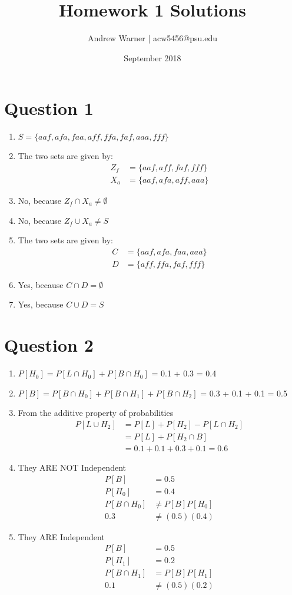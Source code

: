 \documentclass[12pt, letterpaper, fleqn]{article}
\title{Homework 1 Solutions}
\author{Andrew Warner | acw5456@psu.edu}
\date{September 2018}
\begin{document}
\maketitle
\section*{Question 1}
	\begin{enumerate}
		\item $S = \{aaf, afa, faa, aff, ffa, faf, aaa, fff\}$
		\item The two sets are given by:
			\begin{align*}
				Z_{f} &= \{ aaf, aff, faf, fff \} \\
     				X_{a} &= \{ aaf, afa, aff, aaa \}
			\end{align*}
		\item No, because $Z_{f} \cap X_{a} \neq \emptyset$
		\item No, because $Z_{f} \cup X_{a} \neq S$
		\item  The two sets are given by:
			\begin{align*}
				C &= \{aaf, afa, faa, aaa\} \\
				D &= \{aff, ffa, faf, fff\}
			\end{align*}
		 \item Yes, because $C \cap D = \emptyset$
		 \item Yes, because $C \cup D = S$
	\end{enumerate}
\section*{Question 2}
	\begin{enumerate}
		\item $P[H_{0}] = P[L \cap H_0] + P[B \cap H_0]$ = 0.1 + 0.3 = 0.4
		\item $P[B] = P[B \cap H_0] + P[B \cap H_1] + P[B \cap H_2]$ = 0.3 + 0.1 + 0.1 = 0.5
		\item From the additive property of probabilities
			\begin{align*}
				P[L \cup H_2] &= P[L] + P[H_2] - P[L \cap H_2] \\
				& = P[L] + P[H_2 \cap B] \\
				&= 0. 1 + 0.1 + 0.3 + 0.1 = 0.6
			\end{align*}	
		\item They ARE NOT Independent
			\begin{align*}
				P[B] &= 0.5 \\
				P[H_0] &= 0.4 \\
				P[B \cap H_0] &\neq P[B]P[H_0] \\
				0.3 &\neq (0.5)(0.4)
			\end{align*}
		\item They ARE Independent
			\begin {align*}
				P[B] &= 0.5 \\
				P[H_1] &= 0.2 \\
				P[B \cap H_1] &= P[B]P[H_1] \\
				0.1 &\neq (0.5)(0.2) 
			\end{align*}
	\end{enumerate}
\end{document}
